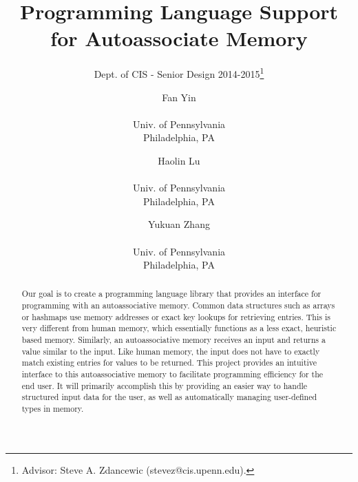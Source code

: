 \documentclass{sig-alternate}
\begin{document}
 

\title{Programming Language Support for Autoassociate Memory}
\subtitle{Dept. of CIS - Senior Design 2014-2015\thanks{Advisor: Steve A. Zdancewic (stevez@cis.upenn.edu).}}
\author{
    Fan Yin \\  \\Univ. of Pennsylvania \\ Philadelphia, PA
    \and Haolin Lu \\  \\Univ. of Pennsylvania \\ Philadelphia, PA
    \and Yukuan Zhang\\  \\Univ. of Pennsylvania \\ Philadelphia, PA
}
%
%
\date{}
\maketitle


\begin{abstract}
    Our goal is to create a programming language library that provides an interface
    for programming with an autoassociative memory. Common data structures such as 
    arrays or hashmaps use memory addresses or exact key lookups for retrieving entries.
    This is very different from human memory, which essentially functions as a less exact, heuristic
    based memory. Similarly, an autoassociative memory receives an input and returns a value similar to the input. Like human memory, the input does not have to exactly match existing entries
    for values to be returned. This project provides an intuitive interface to this autoassociative memory to facilitate programming efficiency for the end user. It will primarily
    accomplish this by providing an easier way to handle structured input data for the user, as well
    as automatically managing user-defined types in memory.
\end{abstract}
\end{document}
